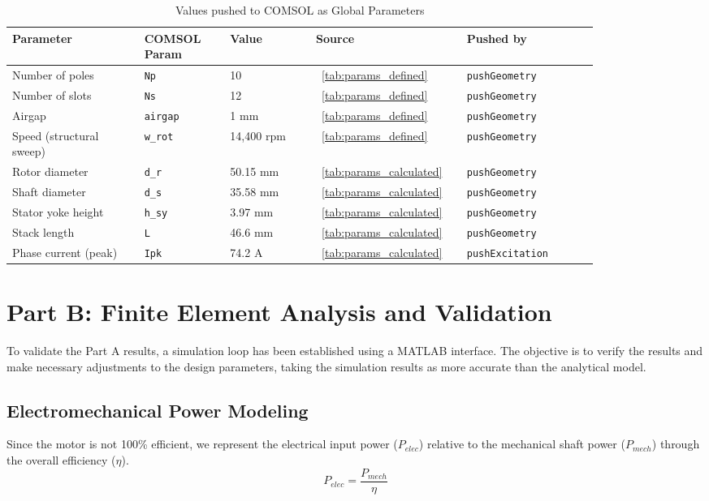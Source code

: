 \documentclass[10pt,final,journal,a4paper,oneside,twocolumn]{IEEEtran}
\begin{document}
\begin{table}[!t]
\centering
\footnotesize
\caption{Values pushed to COMSOL as Global Parameters}
\label{tab:params_pushed}
\begin{tabular}{@{}L{0.20\linewidth}L{0.13\linewidth}L{0.13\linewidth}L{0.18\linewidth}L{0.20\linewidth}@{}}
\toprule
\textbf{Parameter} & \textbf{COMSOL Param} & \textbf{Value} & \textbf{Source} & \textbf{Pushed by} \\
\midrule
Number of poles & \texttt{Np} & 10 & \tablename~\ref{tab:params_defined} & \texttt{pushGeometry} \\
Number of slots & \texttt{Ns} & 12 & \tablename~\ref{tab:params_defined} & \texttt{pushGeometry} \\
Airgap & \texttt{airgap} & 1 mm & \tablename~\ref{tab:params_defined} & \texttt{pushGeometry} \\
Speed (structural sweep) & \texttt{w\_rot} & 14,400 rpm & \tablename~\ref{tab:params_defined} & \texttt{pushGeometry} \\
Rotor diameter & \texttt{d\_r} & 50.15 mm & \tablename~\ref{tab:params_calculated} & \texttt{pushGeometry} \\
Shaft diameter & \texttt{d\_s} & 35.58 mm & \tablename~\ref{tab:params_calculated} & \texttt{pushGeometry} \\
Stator yoke height & \texttt{h\_sy} & 3.97 mm & \tablename~\ref{tab:params_calculated} & \texttt{pushGeometry} \\
Stack length & \texttt{L} & 46.6 mm & \tablename~\ref{tab:params_calculated} & \texttt{pushGeometry} \\
Phase current (peak) & \texttt{Ipk} & 74.2 A & \tablename~\ref{tab:params_calculated} & \texttt{pushExcitation} \\
\bottomrule
\end{tabular}
\end{table}

\section{Part B: Finite Element Analysis and Validation}
\label{sec:part_b_fea}
To validate the Part A results, a simulation loop has been established using a MATLAB interface. The objective is to verify the results and make necessary adjustments to the design parameters, taking the simulation results as more accurate than the analytical model.

\subsection{Electromechanical Power Modeling}
Since the motor is not 100\% efficient, we represent the electrical input power ($P_{elec}$) relative to the mechanical shaft power ($P_{mech}$) through the overall efficiency ($\eta$).
\begin{equation}
    P_{elec} = \frac{P_{mech}}{\eta}
\end{equation}
\end{document}
